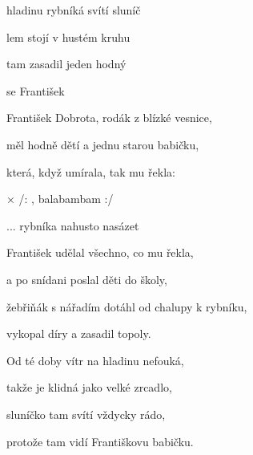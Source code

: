 

\zs
{} hladinu rybníká svítí sluníč

lem stojí v hustém kruhu 

 tam zasadil jeden hodný 

 se František 

\ks \zs
František Dobrota, rodák z blízké vesnice,

měl hodně dětí a jednu starou babičku,

která, když umírala, tak mu řekla: 
\ks

× /: , balabambam    :/

...  rybníka nahusto nasázet 
\kr

\zs
František udělal všechno, co mu řekla,

a po snídani poslal děti do školy,

žebřiňák s nářadím dotáhl od chalupy k rybníku,

vykopal díry a zasadil topoly.

\ks \zs
Od té doby vítr na hladinu nefouká,

takže je klidná jako velké zrcadlo,

sluníčko tam svítí vždycky rádo,

protože tam vidí Františkovu babičku.
\ks

\kp







